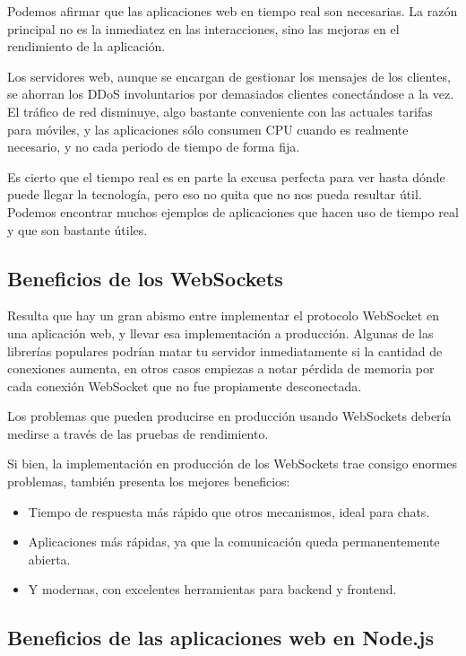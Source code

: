 Podemos afirmar que las aplicaciones web en tiempo real son necesarias. La razón principal no es la inmediatez en las interacciones, sino las mejoras en el rendimiento de la aplicación.

Los servidores web, aunque se encargan de gestionar los mensajes de los clientes, se ahorran los DDoS involuntarios por demasiados clientes conectándose a la vez. El tráfico de red disminuye, algo bastante conveniente con las actuales tarifas para móviles, y las aplicaciones sólo consumen CPU cuando es realmente necesario, y no cada periodo de tiempo de forma fija.

Es cierto que el tiempo real es en parte la excusa perfecta para ver hasta dónde puede llegar la tecnología, pero eso no quita que no nos pueda resultar útil. Podemos encontrar muchos ejemplos de aplicaciones que hacen uso de tiempo real y que son bastante útiles.

\subsection{Beneficios de los WebSockets}

Resulta que hay un gran abismo entre implementar el protocolo WebSocket en una aplicación web, y llevar esa implementación a producción. Algunas de las librerías populares podrían matar tu servidor inmediatamente si la cantidad de conexiones aumenta, en otros casos empiezas a notar pérdida de memoria por cada conexión WebSocket que no fue propiamente desconectada.

Los problemas que pueden producirse en producción usando WebSockets debería medirse a través de las pruebas de rendimiento.

Si bien, la implementación en producción de los WebSockets trae consigo enormes problemas, también presenta los mejores beneficios:

\begin{itemize}
  \item Tiempo de respuesta más rápido que otros mecanismos, ideal para chats.
  \item Aplicaciones más rápidas, ya que la comunicación queda permanentemente abierta.
  \item Y modernas, con excelentes herramientas para backend y frontend.
\end{itemize}

\subsection{Beneficios de las aplicaciones web en Node.js}

